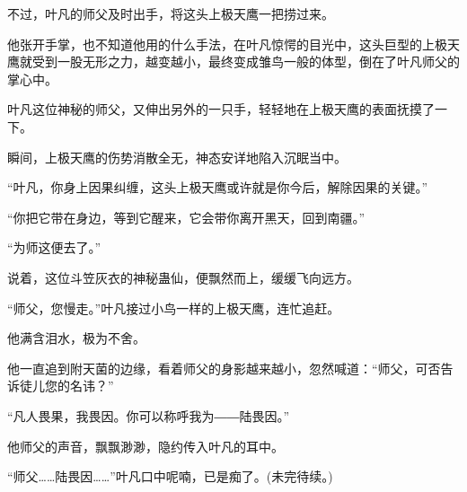 \begin{this_body}
不过，叶凡的师父及时出手，将这头上极天鹰一把捞过来。

他张开手掌，也不知道他用的什么手法，在叶凡惊愕的目光中，这头巨型的上极天鹰就受到一股无形之力，越变越小，最终变成雏鸟一般的体型，倒在了叶凡师父的掌心中。

叶凡这位神秘的师父，又伸出另外的一只手，轻轻地在上极天鹰的表面抚摸了一下。

瞬间，上极天鹰的伤势消散全无，神态安详地陷入沉眠当中。

“叶凡，你身上因果纠缠，这头上极天鹰或许就是你今后，解除因果的关键。”

“你把它带在身边，等到它醒来，它会带你离开黑天，回到南疆。”

“为师这便去了。”

说着，这位斗笠灰衣的神秘蛊仙，便飘然而上，缓缓飞向远方。

“师父，您慢走。”叶凡接过小鸟一样的上极天鹰，连忙追赶。

他满含泪水，极为不舍。

他一直追到附天菌的边缘，看着师父的身影越来越小，忽然喊道：“师父，可否告诉徒儿您的名讳？”

“凡人畏果，我畏因。你可以称呼我为――陆畏因。”

他师父的声音，飘飘渺渺，隐约传入叶凡的耳中。

“师父……陆畏因……”叶凡口中呢喃，已是痴了。(未完待续。)

\end{this_body}

